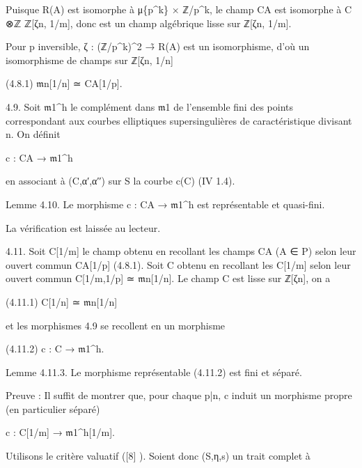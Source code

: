 \documentclass[11pt,a4paper]{article}
\begin{document}
Puisque R(A) est isomorphe à μ\textunderscore{}\{p\textasciicircum{}k\} × ℤ/p\textasciicircum{}k, le champ C\textunderscore{}A est isomorphe à C ⊗\textunderscore{}ℤ ℤ[ζ\textunderscore{}n, 1/m], donc est un champ algébrique lisse sur ℤ[ζ\textunderscore{}n, 1/m].

Pour p inversible, ζ : (ℤ/p\textasciicircum{}k)\textasciicircum{}2 →̃ R(A) est un isomorphisme, d'où un isomorphisme de champs sur ℤ[ζ\textunderscore{}n, 1/n]

(4.8.1)        \ensuremath{\mathfrak{m}}\textunderscore{}n[1/n] ≃ C\textunderscore{}A[1/p].

4.9. Soit \ensuremath{\mathfrak{m}}\textunderscore{}1\textasciicircum{}h le complément dans \ensuremath{\mathfrak{m}}\textunderscore{}1 de l'ensemble fini des points correspondant aux courbes elliptiques supersingulières de caractéristique divisant n. On définit

c : C\textunderscore{}A → \ensuremath{\mathfrak{m}}\textunderscore{}1\textasciicircum{}h

en associant à (C,α′,α′′) sur S la courbe c(C) (IV 1.4).

Lemme 4.10. Le morphisme c : C\textunderscore{}A → \ensuremath{\mathfrak{m}}\textunderscore{}1\textasciicircum{}h est représentable et quasi-fini.

La vérification est laissée au lecteur.

4.11. Soit C[1/m] le champ obtenu en recollant les champs C\textunderscore{}A (A ∈ P) selon leur ouvert commun C\textunderscore{}A[1/p] (4.8.1). Soit C obtenu en recollant les C[1/m] selon leur ouvert commun C[1/m,1/p] ≃ \ensuremath{\mathfrak{m}}\textunderscore{}n[1/n]. Le champ C est lisse sur ℤ[ζ\textunderscore{}n], on a

(4.11.1)        C[1/n] ≃ \ensuremath{\mathfrak{m}}\textunderscore{}n[1/n]

et les morphismes 4.9 se recollent en un morphisme

(4.11.2)        c : C → \ensuremath{\mathfrak{m}}\textunderscore{}1\textasciicircum{}h.

Lemme 4.11.3. Le morphisme représentable (4.11.2) est fini et séparé.

Preuve : Il suffit de montrer que, pour chaque p|n, c induit un morphisme propre (en particulier séparé)

c : C[1/m] → \ensuremath{\mathfrak{m}}\textunderscore{}1\textasciicircum{}h[1/m].

Utilisons le critère valuatif ([8]     ). Soient donc (S,η,s) un trait complet à
\end{document}
